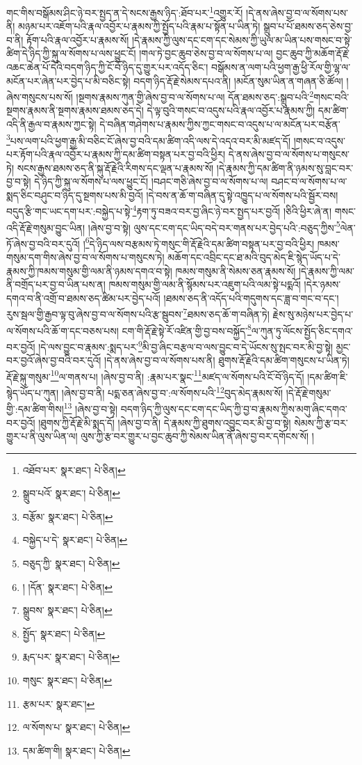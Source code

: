གང་གིས་བསྒོམས་ཤིང་ཉེ་བར་སྤྱད་ན་དེ་སངས་རྒྱས་ཉིད་:ཐོབ་པར་\footnote{འཐོབ་པར་  སྣར་ཐང་།  པེ་ཅིན། }འགྱུར་རོ། །དེ་ནས་ཞེས་བྱ་བ་ལ་སོགས་པས་ནི། མཉམ་པར་འཇོག་པའི་རྣལ་འབྱོར་པ་རྣམས་ཀྱི་སྤྱོད་པའི་རྣམ་པ་སྟོན་པ་ཡིན་ཏེ། སྒྲུབ་པ་པོ་ཐམས་ཅད་ཅེས་བྱ་བ་ནི། རྟོག་པའི་རྣལ་འབྱོར་པ་རྣམས་སོ། །དེ་རྣམས་ཀྱི་ལུས་དང་ངག་དང་སེམས་ཀྱི་ཡུལ་མ་ཡིན་པས་གསང་བ་སྟེ་ཚིག་དེ་ཉིད་ཀྱི་སྐུ་ལ་སོགས་པ་ལས་ཕྱུང་ངོ། །གལ་ཏེ་བྱང་ཆུབ་ཅེས་བྱ་བ་ལ་སོགས་པ་ལ། བྱང་ཆུབ་ཀྱི་མཆོག་རྡོ་རྗེ་འཆང་ཆེན་པོ་དེའི་བདག་ཉིད་ཀྱི་ངོ་བོ་ཉིད་དུ་གྱུར་པར་འདོད་ཅིང་། བསྒོམས་ན་ལག་པའི་ཕྱག་རྒྱ་ཕྱི་རོལ་གྱི་ལྷ་ལ་མངོན་པར་ཞེན་པར་བྱེད་པ་མི་བཅིང་སྟེ། བདག་ཉིད་རྡོ་རྗེ་སེམས་དཔའ་ནི། །མངོན་སུམ་ཡིན་ན་གཞན་ཅི་ཚོལ། །ཞེས་གསུངས་པས་སོ། །སྔགས་རྣམས་ཀུན་གྱི་ཞེས་བྱ་བ་ལ་སོགས་པ་ལ། དོན་ཐམས་ཅད་:སྒྲུབ་པའི་\footnote{སྒྲུབ་པའོ་  སྣར་ཐང་།  པེ་ཅིན། }གསང་བའི་སྔགས་རྣམས་ནི་སྔགས་རྣམས་ཐམས་ཅད་དེ། དེ་ལྟ་བུའི་གསང་བ་འདུས་པའི་རྣལ་འབྱོར་པ་རྣམས་ཀྱི། དམ་ཚིག་འདི་ནི་རྒྱལ་བ་རྣམས་ཀྱང་སྟེ། དེ་བཞིན་གཤེགས་པ་རྣམས་ཀྱིས་ཀྱང་གསང་བ་འདུས་པ་ལ་མངོན་པར་བརྩོན་\footnote{བརྩོམ་  སྣར་ཐང་།  པེ་ཅིན། }པས་ལག་པའི་ཕྱག་རྒྱ་མི་བཅིང་ངོ་ཞེས་བྱ་བའི་དམ་ཚིག་འདི་ལས་དེ་འདའ་བར་མི་མཛད་དོ། །གསང་བ་འདུས་པར་རྟོག་པའི་རྣལ་འབྱོར་པ་རྣམས་ཀྱི་དམ་ཚིག་བསྟན་པར་བྱ་བའི་ཕྱིར། དེ་ནས་ཞེས་བྱ་བ་ལ་སོགས་པ་གསུངས་ཏེ། སངས་རྒྱས་ཐམས་ཅད་ནི་སྐུ་རྡོ་རྗེའི་རིགས་དང་ལྡན་པ་རྣམས་སོ། །དེ་རྣམས་ཀྱི་དམ་ཚིག་ནི་ཉམས་སུ་བླང་བར་བྱ་བ་སྟེ། དེ་ཉིད་ཀྱི་སྐུ་ལ་སོགས་པ་ལས་ཕྱུང་ངོ། །བཤང་གཅི་ཞེས་བྱ་བ་ལ་སོགས་པ་ལ། བཤང་བ་ལ་སོགས་པ་ལ་སྨད་ཅིང་བཤུང་བ་ཉིད་དུ་སྔགས་པས་མི་བྱའོ། །དེ་བས་ན་ཆོ་ག་བཞིན་དུ་སྟེ་འཁྱུད་པ་ལ་སོགས་པའི་སྦྱོར་བས། བདུད་རྩི་གང་ཡང་དག་པར་:བསྐྱེད་པ་སྟེ་\footnote{བསྐྱེད་པ་དེ་  སྣར་ཐང་།  པེ་ཅིན། }རྟག་ཏུ་བཟའ་བར་བྱ་ཞིང་ཉེ་བར་སྤྱད་པར་བྱའོ། །ཅིའི་ཕྱིར་ཞེ་ན། གསང་འདི་རྡོ་རྗེ་གསུམ་བྱུང་ཡིན། །ཞེས་བྱ་བ་སྟེ། ལུས་དང་ངག་དང་ཡིད་བདེ་བར་གནས་པར་བྱེད་པའི་:བཅུད་ཀྱིས་\footnote{བཅུད་ཀྱི་  སྣར་ཐང་།  པེ་ཅིན། }ལེན་ཏོ་ཞེས་བྱ་བའི་བར་དུའོ། །\footnote{། །དོན་  སྣར་ཐང་།  པེ་ཅིན། }དེ་ཉིད་ལས་བརྩམས་ཏེ་གསུང་གི་རྡོ་རྗེའི་དམ་ཚིག་བསྟན་པར་བྱ་བའི་ཕྱིར། ཁམས་གསུམ་དག་གིས་ཞེས་བྱ་བ་ལ་སོགས་པ་གསུངས་ཏེ། མཆོག་དང་འབྲིང་དང་ཐ་མའི་བུད་མེད་ཇི་སྙེད་ཡོད་པ་དེ་རྣམས་ཀྱི་ཁམས་གསུམ་གྱི་ལམ་ནི་ཉམས་དགའ་བ་སྟེ། ཁམས་གསུམ་ནི་སེམས་ཅན་རྣམས་སོ། །དེ་རྣམས་ཀྱི་ལམ་ནི་བགྲོད་པར་བྱ་བ་ཡིན་པས་ན། ཁམས་གསུམ་གྱི་ལམ་ནི་སྙོམས་པར་འཇུག་པའི་ལམ་སྟེ་པདྨའོ། །དེར་ཉམས་དགའ་བ་ནི་འགྲོ་བ་ཐམས་ཅད་ཚིམ་པར་བྱེད་པའོ། །ཐམས་ཅད་ནི་འདོད་པའི་གདུགས་དང་ཟླ་བ་གང་བ་དང་། རུས་སྦལ་གྱི་རྒྱབ་ལྟ་བུ་ཞེས་བྱ་བ་ལ་སོགས་པའི་རྩ་སྦུབས་\footnote{སྒྲུབས་  སྣར་ཐང་།  པེ་ཅིན། }ཐམས་ཅད་ཆོ་ག་བཞིན་ཏེ། རྗེས་སུ་མཉེས་པར་བྱེད་པ་ལ་སོགས་པའི་ཆོ་ག་དང་བཅས་པས། ངག་གི་རྡོ་རྗེ་སྟེ་རོ་འཛིན་གྱི་བྱ་བས་བསྐྱོད་\footnote{སྤྱོད་  སྣར་ཐང་།  པེ་ཅིན། }ལ་ཀུན་ཏུ་ལོངས་སྤྱོད་ཅིང་དགའ་བར་བྱའོ། །དེ་ལས་བྱུང་བ་རྣམས་:སྨད་པར་\footnote{རྨད་པར་  སྣར་ཐང་།  པེ་ཅིན། }མི་བྱ་ཞིང་བརྩལ་བ་ལས་བྱུང་བ་དེ་ཡོངས་སུ་སྤང་བར་མི་བྱ་སྟེ། མྱང་བར་བྱའོ་ཞེས་བྱ་བའི་བར་དུའོ། །དེ་ནས་ཞེས་བྱ་བ་ལ་སོགས་པས་ནི། ཐུགས་རྡོ་རྗེའི་དམ་ཚིག་གསུངས་པ་ཡིན་ཏེ། རྡོ་རྗེ་སྐུ་གསུམ་\footnote{གསུང་  སྣར་ཐང་།  པེ་ཅིན། }ལ་གནས་པ། །ཞེས་བྱ་བ་ནི། :རྣམ་པར་སྣང་\footnote{རྩམ་པར་  སྣར་ཐང་། }མཛད་ལ་སོགས་པའི་ངོ་བོ་ཉིད་དོ། །དམ་ཚིག་ཇི་སྙེད་ཡོད་པ་ཀུན། །ཞེས་བྱ་བ་ནི། པདྨ་ཅན་ཞེས་བྱ་བ་:ལ་སོགས་པའི་\footnote{ལ་སོགས་པ་  སྣར་ཐང་།  པེ་ཅིན། }བུད་མེད་རྣམས་སོ། །དེ་རྡོ་རྗེ་གསུམ་གྱི་:དམ་ཚིག་གིས།\footnote{དམ་ཚིག་གི།  སྣར་ཐང་།  པེ་ཅིན། } །ཞེས་བྱ་བ་སྟེ། བདག་ཉིད་ཀྱི་ལུས་དང་ངག་དང་ཡིད་ཀྱི་བྱ་བ་རྣམས་ཀྱིས་མགུ་ཞིང་དགའ་བར་བྱའོ། །ཐུགས་ཀྱི་རྡོ་རྗེ་མི་སྨད་དོ། །ཞེས་བྱ་བ་ནི། དེ་རྣམས་ཀྱི་ཐུགས་འབྱུང་བར་མི་བྱ་བ་སྟེ། སེམས་ཀྱི་རྩ་བར་གྱུར་པ་ནི་ལུས་ཡིན་ལ། ལུས་ཀྱི་རྩ་བར་གྱུར་པ་བྱང་ཆུབ་ཀྱི་སེམས་ཡིན་ནོ་ཞེས་བྱ་བར་དགོངས་སོ། །

